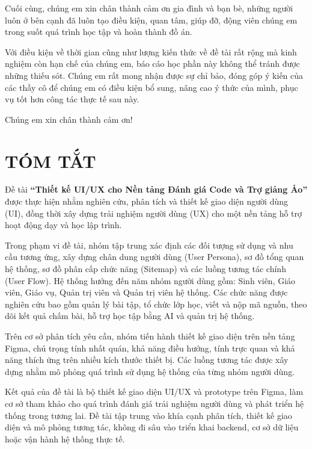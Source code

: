 \documentclass[12pt,a4paper,oneside]{report}
\begin{document}
Cuối cùng, chúng em xin chân thành cảm ơn gia đình và bạn bè, những người luôn ở bên cạnh đã luôn tạo điều kiện, quan tâm, giúp đỡ, động viên chúng em trong suốt quá trình học tập và hoàn thành đồ án.

Với điều kiện về thời gian cũng như lượng kiến thức về đề tài rất rộng mà kinh nghiệm còn hạn chế của chúng em, báo cáo học phần này không thể tránh được những thiếu sót. Chúng em rất mong nhận được sự chỉ bảo, đóng góp ý kiến của các thầy cô để chúng em có điều kiện bổ sung, nâng cao ý thức của mình, phục vụ tốt hơn công tác thực tế sau này.

Chúng em xin chân thành cảm ơn!

\newpage

\chapter*{TÓM TẮT}

Đề tài \textbf{``Thiết kế UI/UX cho Nền tảng Đánh giá Code và Trợ giảng Ảo''} được thực hiện nhằm nghiên cứu, phân tích và thiết kế giao diện người dùng (UI), đồng thời xây dựng trải nghiệm người dùng (UX) cho một nền tảng hỗ trợ hoạt động dạy và học lập trình.

Trong phạm vi đề tài, nhóm tập trung xác định các đối tượng sử dụng và nhu cầu tương ứng, xây dựng chân dung người dùng (User Persona), sơ đồ tổng quan hệ thống, sơ đồ phân cấp chức năng (Sitemap) và các luồng tương tác chính (User Flow). Hệ thống hướng đến năm nhóm người dùng gồm: Sinh viên, Giáo viên, Giáo vụ, Quản trị viên và Quản trị viên hệ thống. Các chức năng được nghiên cứu bao gồm quản lý bài tập, tổ chức lớp học, viết và nộp mã nguồn, theo dõi kết quả chấm bài, hỗ trợ học tập bằng AI và quản trị hệ thống.

Trên cơ sở phân tích yêu cầu, nhóm tiến hành thiết kế giao diện trên nền tảng Figma, chú trọng tính nhất quán, khả năng điều hướng, tính trực quan và khả năng thích ứng trên nhiều kích thước thiết bị. Các luồng tương tác được xây dựng nhằm mô phỏng quá trình sử dụng hệ thống của từng nhóm người dùng.

Kết quả của đề tài là bộ thiết kế giao diện UI/UX và prototype trên Figma, làm cơ sở tham khảo cho quá trình đánh giá trải nghiệm người dùng và phát triển hệ thống trong tương lai. Đề tài tập trung vào khía cạnh phân tích, thiết kế giao diện và mô phỏng tương tác, không đi sâu vào triển khai backend, cơ sở dữ liệu hoặc vận hành hệ thống thực tế.
\end{document}

